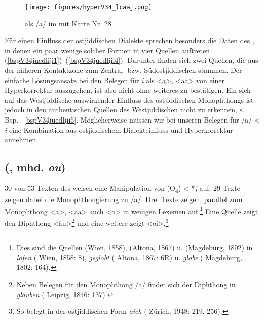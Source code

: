  	\begin{figure}
		\centering
\texttt{[image: figures/hyperV34\_lcaaj.png]}
		\caption{\label{karteV34hyper}   als /a\textlengthmark/ im  mit  Karte Nr. 28}
		\end{figure}

 
Für einen Einfluss der ostjiddischen Dialekte sprechen besonders die Daten des , in denen ein paar wenige solcher Formen in vier Quellen auftreten (\ref{bspV34juedliji1})–(\ref{bspV34juedliji4}).  Darunter finden sich zwei Quellen, die aus der näheren Kontaktzone zum Zentral- bzw. Südostjiddischen stammen. Der einfache Lösungsansatz bei den Belegen für {\mhd} \textit{î} als <a>, <aa> von einer Hyperkorrektur auszugehen, ist also nicht ohne weiteres zu bestätigen. Ein sich auf das Westjiddische auswirkender Einfluss des ostjiddischen Monophthongs ist jedoch in den authentischen Quellen des Westjiddischen nicht zu erkennen, s. Bsp. \,%
\ref{bspV34juedliji5}. Möglicherweise müssen wir bei unseren Belegen für /a\textlengthmark/ < {\mhd} \textit{î} eine Kombination aus ostjiddischem Dialekteinfluss und Hyperkorrektur annehmen. 


    

 
    \subsection{ (, mhd.  \textit{ou})}\label{phonV44}
30 von 53 Texten des  weisen eine Manipulation von  (O\textsubscript{4}) < {\urj} *\textit{\textopeno j\textlengthmark} auf. 29 Texte zeigen dabei die Monophthongierung zu /a\textlengthmark/. Drei Texte zeigen, parallel zum Monophthong <a>, <aa> auch <o> in wenigen Lexemen auf.\footnote{Dies sind die Quellen  (Wien, 1858),  (Altona, 1867) u.  (Magdeburg, 1802) in \textit{lofen}  ( Wien, 1858: 8), \textit{geglobt}  ( Altona, 1867: 6R) u. \textit{globe}  ( Magdeburg, 1802: 164).} Eine Quelle zeigt den Diphthong <äu>\footnote{Neben Belegen für den Monophthong /a\textlengthmark/ findet sich der Diphthong in \textit{gläuben}  ( Leipzig, 1846: 137).} und eine weitere zeigt <oi>.\footnote{So belegt in der ostjiddischen Form \textit{oich}  ( Zürich, 1948: 219, 256).} 


